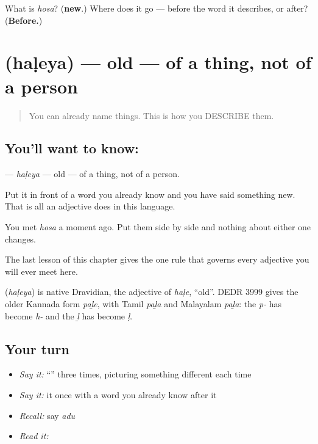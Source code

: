 \begin{tcolorbox}[breakable,colback=teal!4,colframe=teal!35!black,title={Before you move on}]
What is \emph{hosa}? (\textbf{new}.) Where does it go — before the word it describes, or after? (\textbf{Before.})
\end{tcolorbox}
\section[\texorpdfstring{\kn{ಹಳೆಯ} (haḷeya)}{ಹಳೆಯ (haḷeya)}]{ (haḷeya) — old — of a thing, not of a person}

\label{lesson:KA-C42-old}



\begin{quote}
You can already name things. This is how you DESCRIBE them.
\end{quote}

\subsection*{You'll want to know: }
\textbf{} — \emph{haḷeya} — old — of a thing, not of a person.

Put it in front of a word you already know and you have said something new. That is all an adjective does in this language.

You met \textbf{} \emph{hosa} a moment ago. Put them side by side and nothing about either one changes.

The last lesson of this chapter gives the one rule that governs every adjective you will ever meet here.

\begin{cousinweb}
\textbf{} (\emph{haḷeya}) is native Dravidian, the adjective of \emph{haḷe}, \textquotedblleft{}old\textquotedblright{}. DEDR 3999 gives the older Kannada form \emph{paḻe}, with Tamil \emph{paḻa} and Malayalam \emph{paḻa}: the \emph{p-} has become \emph{h-} and the \emph{ḻ} has become \emph{ḷ}.
\end{cousinweb}

\subsection*{Your turn}
\begin{itemize}
\raggedright
  \item \emph{Say it:} \textquotedblleft{}\textquotedblright{} three times, picturing something different each time
  \item \emph{Say it:} it once with a word you already know after it
  \item \emph{Recall:} say \emph{adu}
  \item \emph{Read it:} \textbf{}
\end{itemize}

